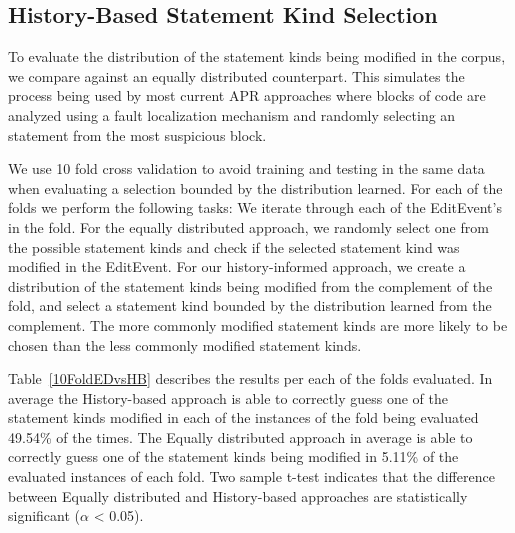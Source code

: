 \documentclass[sigconf]{acmart}
\begin{document}
\subsection{History-Based Statement Kind Selection}
To evaluate the distribution of the statement kinds being modified
in the corpus, we compare against an equally distributed counterpart.
This simulates the process being used by most current APR approaches
where blocks of code are analyzed using a fault localization 
mechanism and randomly selecting an statement from the most
suspicious block.

We use 10 fold
cross validation to avoid training and testing in the same data
when evaluating a selection bounded by the distribution
learned. For each of the folds we perform the following
tasks:
We iterate through each of the EditEvent's in the fold. For
the equally distributed approach, we randomly select one from 
the possible statement kinds and check if the selected
statement kind was modified in the EditEvent.
For our history-informed approach, we create a distribution
of the statement kinds being modified from the complement of the fold, 
and select a statement
kind bounded by the distribution 
learned from the complement. The more commonly modified statement
kinds are more likely to be chosen than the less commonly modified
statement kinds.

Table~\ref{10FoldEDvsHB} describes the results per each of the folds evaluated.
In average 
the History-based approach is able to correctly guess one of the statement kinds modified
in each of the instances of the fold being evaluated 49.54\% of the times. The Equally distributed approach
in average is able to correctly guess one of the statement kinds being modified in 5.11\% 
of the evaluated instances of each fold.
Two sample t-test indicates that the difference between Equally distributed and History-based approaches are statistically significant ($\alpha$ < 0.05).
\end{document}
